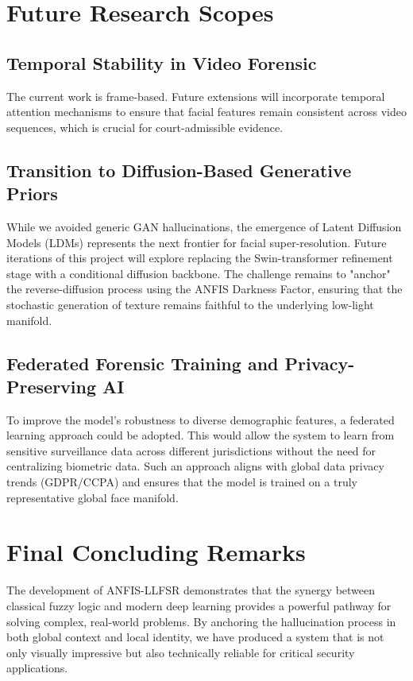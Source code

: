 \section{Future Research Scopes}
\subsection{Temporal Stability in Video Forensic}
The current work is frame-based. Future extensions will incorporate temporal attention mechanisms to ensure that facial features remain consistent across video sequences, which is crucial for court-admissible evidence.

\subsection{Transition to Diffusion-Based Generative Priors}
While we avoided generic GAN hallucinations, the emergence of Latent Diffusion Models (LDMs) represents the next frontier for facial super-resolution. Future iterations of this project will explore replacing the Swin-transformer refinement stage with a conditional diffusion backbone. The challenge remains to "anchor" the reverse-diffusion process using the ANFIS Darkness Factor, ensuring that the stochastic generation of texture remains faithful to the underlying low-light manifold.

\subsection{Federated Forensic Training and Privacy-Preserving AI}
To improve the model's robustness to diverse demographic features, a federated learning approach could be adopted. This would allow the system to learn from sensitive surveillance data across different jurisdictions without the need for centralizing biometric data. Such an approach aligns with global data privacy trends (GDPR/CCPA) and ensures that the model is trained on a truly representative global face manifold.
    
\section{Final Concluding Remarks}
The development of ANFIS-LLFSR demonstrates that the synergy between classical fuzzy logic and modern deep learning provides a powerful pathway for solving complex, real-world problems. By anchoring the hallucination process in both global context and local identity, we have produced a system that is not only visually impressive but also technically reliable for critical security applications.
